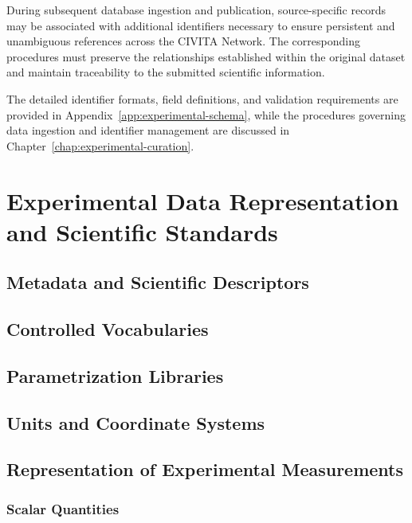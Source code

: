 During subsequent
database ingestion
and publication,
source-specific
records may be
associated with
additional identifiers
necessary to ensure
persistent and
unambiguous references
across the CIVITA Network.
The corresponding
procedures must
preserve the
relationships
established within
the original dataset
and maintain
traceability to
the submitted
scientific information.

The detailed identifier
formats, field definitions,
and validation
requirements are
provided in
Appendix~\ref{app:experimental-schema},
while the procedures
governing data ingestion
and identifier management
are discussed in
Chapter~\ref{chap:experimental-curation}.

\clearpage
\pagestyle{empty}
\cleardoublepage
\endgroup


\chapter{Experimental Data Representation and Scientific Standards}
\label{chap:experimental-data-standards}

\section{Metadata and Scientific Descriptors}

\section{Controlled Vocabularies}

\section{Parametrization Libraries}

\section{Units and Coordinate Systems}

\section{Representation of Experimental Measurements}

\subsection{Scalar Quantities}

